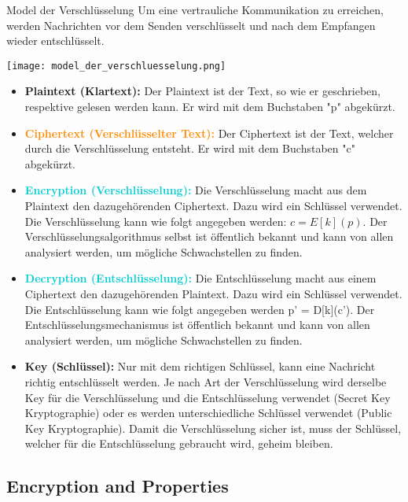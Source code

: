 \begin{concept}{Model der Verschlüsselung}
    Um eine vertrauliche Kommunikation zu erreichen, werden Nachrichten vor dem Senden verschlüsselt und nach dem Empfangen wieder entschlüsselt.

    \texttt{[image: model\_der\_verschluesselung.png]}

    \begin{itemize}
        \item \textcolor{darkcorn}{\textbf{Plaintext (Klartext):}} Der Plaintext ist der Text, so wie er geschrieben, respektive gelesen werden kann. Er wird mit dem Buchstaben "p" abgekürzt.
        \item \textcolor{darkorange}{\textbf{Ciphertext (Verschlüsselter Text):}} Der Ciphertext ist der Text, welcher durch die Verschlüsselung entsteht. Er wird mit dem Buchstaben "c" abgekürzt.
        \item \textcolor{darkturquoise}{\textbf{Encryption (Verschlüsselung):}} Die Verschlüsselung macht aus dem Plaintext den dazugehörenden Ciphertext. Dazu wird ein Schlüssel verwendet. Die Verschlüsselung kann wie folgt angegeben werden: $c=E[k](p)$. Der Verschlüsselungsalgorithmus selbst ist öffentlich bekannt und kann von allen analysiert werden, um mögliche Schwachstellen zu finden.
        \item \textcolor{darkturquoise}{\textbf{Decryption (Entschlüsselung):}} Die Entschlüsselung macht aus einem Ciphertext den dazugehörenden Plaintext. Dazu wird ein Schlüssel verwendet. Die Entschlüsselung kann wie folgt angegeben werden p' = D[k](c'). Der Entschlüsselungsmechanismus ist öffentlich bekannt und kann von allen analysiert werden, um mögliche Schwachstellen zu finden.
        \item \textcolor{darkpink}{\textbf{Key (Schlüssel):}} Nur mit dem richtigen Schlüssel, kann eine Nachricht richtig entschlüsselt werden. Je nach Art der Verschlüsselung wird derselbe Key für die Verschlüsselung und die Entschlüsselung verwendet (Secret Key Kryptographie) oder es werden unterschiedliche Schlüssel verwendet (Public Key Kryptographie). Damit die Verschlüsselung sicher ist, muss der Schlüssel, welcher für die Entschlüsselung gebraucht wird, geheim bleiben.
    \end{itemize}    
\end{concept}

\subsection{Encryption and Properties}

